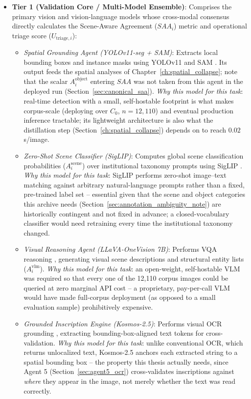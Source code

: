 \documentclass[12pt,a4paper]{report}
\begin{document}
\begin{itemize}
    \item \textbf{Tier 1 (Validation Core / Multi-Model Ensemble)}: Comprises the primary vision and vision-language models whose cross-modal consensus directly calculates the Scene-Aware Agreement ($SAA_i$) metric and operational triage score ($U_{\text{triage}, i}$):
    \begin{itemize}
        \item \textit{Spatial Grounding Agent (YOLOv11-seg + SAM)}: Extracts local bounding boxes and instance masks using YOLOv11 \cite{yolov11_2024} and SAM \cite{sam2023}. Its output feeds the spatial analyses of Chapter~\ref{ch:spatial_collapse}; note that the scalar $A_i^{\text{object}}$ entering $SAA$ was not taken from this agent in the deployed run (Section~\ref{sec:canonical_saa}). \emph{Why this model for this task}: real-time detection with a small, self-hostable footprint is what makes corpus-scale (deploying over $C_0$, $n=12{,}110$) and eventual production inference tractable; its lightweight architecture is also what the distillation step (Section~\ref{ch:spatial_collapse}) depends on to reach $0.02$s/image.
        \item \textit{Zero-Shot Scene Classifier (SigLIP)}: Computes global scene classification probabilities ($A_i^{\text{scene}}$) over institutional taxonomy prompts using SigLIP \cite{siglip2023}. \emph{Why this model for this task}: SigLIP performs zero-shot image--text matching against arbitrary natural-language prompts rather than a fixed, pre-trained label set -- essential given that the scene and object categories this archive needs (Section~\ref{sec:annotation_ambiguity_note}) are historically contingent and not fixed in advance; a closed-vocabulary classifier would need retraining every time the institutional taxonomy changed.
        \item \textit{Visual Reasoning Agent (LLaVA-OneVision 7B)}: Performs VQA reasoning \cite{llava_onevision2024}, generating visual scene descriptions and structural entity lists ($A_i^{\text{vlm}}$). \emph{Why this model for this task}: an open-weight, self-hostable VLM was required so that every one of the 12,110 corpus images could be queried at zero marginal API cost -- a proprietary, pay-per-call VLM would have made full-corpus deployment (as opposed to a small evaluation sample) prohibitively expensive.
        \item \textit{Grounded Inscription Engine (Kosmos-2.5)}: Performs visual OCR grounding \cite{kosmos2_5_2024}, extracting bounding-box-aligned text tokens for cross-validation. \emph{Why this model for this task}: unlike conventional OCR, which returns unlocalized text, Kosmos-2.5 anchors each extracted string to a spatial bounding box -- the property this thesis actually needs, since Agent 5 (Section~\ref{sec:agent5_ocr}) cross-validates inscriptions against \emph{where} they appear in the image, not merely whether the text was read correctly.

\end{itemize}
\end{itemize}
\end{document}
